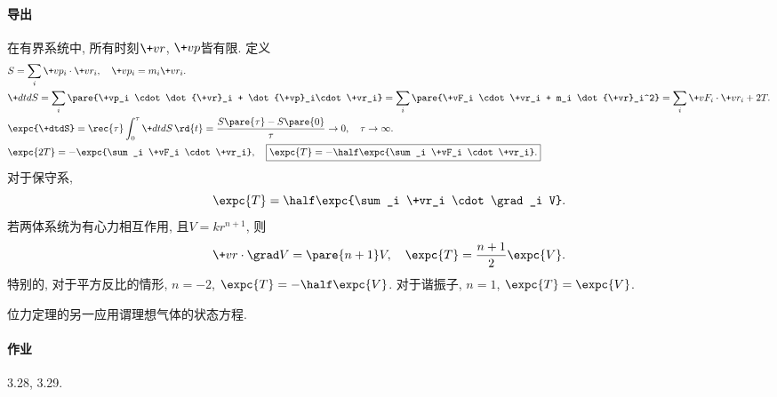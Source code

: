 \documentclass{ctexart}
\begin{document}
\paragraph{导出} %
\label{par:导出}

在有界系统中, 所有时刻$\+vr$, $\+vp$皆有限. 定义
\begin{align*}
    & S = \sum_i \+vp_i \cdot \+vr_i,\quad \+vp_i = m_i \+vr_i. \\
    & \+dtdS = \sum_i \pare{\+vp_i \cdot \dot{\+vr}_i + \dot{\+vp}_i\cdot \+vr_i} = \sum_i \pare{\+vF_i \cdot \+vr_i + m_i \dot{\+vr}_i^2} = \sum_i \+vF_i \cdot \+vr_i + 2T. \\
    & \expc{\+dtdS} = \rec{\tau} \int_0^\tau \+dtdS \,\rd{t} = \frac{S\pare{\tau} - S\pare{0}}{\tau} \rightarrow 0,\quad \tau \rightarrow \infty. \\
    & \expc{2T} = -\expc{\sum_i \+vF_i \cdot \+vr_i}, \quad \boxed{\expc{T} = -\half \expc{\sum_i \+vF_i \cdot \+vr_i}.}
\end{align*}
对于保守系,
\[ \expc{T} = \half \expc{\sum_i \+vr_i \cdot \grad_i V}. \]
若两体系统为有心力相互作用, 且$V = kr^{n+1}$, 则
\[ \+vr\cdot\grad V = \pare{n+1}V,\quad \expc{T} = \frac{n+1}{2}\expc{V}. \]
特别的, 对于平方反比的情形, $n=-2$, $\displaystyle \expc{T} = -\half \expc{V}$. 对于谐振子, $n=1$, $\expc{T} = \expc{V}$.
\begin{remark}
    位力定理的另一应用谓理想气体的状态方程.
\end{remark}


\paragraph{作业} %
\label{par:作业}

3.28, 3.29.




\end{document}

